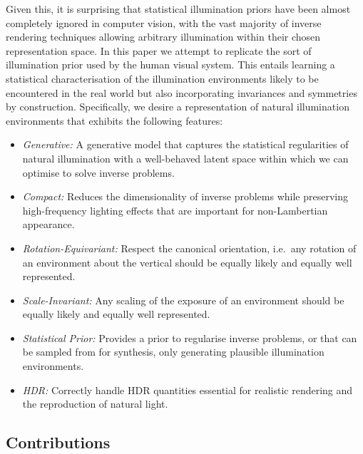 Given this, it is surprising that statistical illumination priors have been almost completely ignored in computer vision, with the vast majority of inverse rendering techniques allowing arbitrary illumination within their chosen representation space. In this paper we attempt to replicate the sort of illumination prior used by the human visual system. This entails learning a statistical characterisation of the illumination environments likely to be encountered in the real world but also incorporating invariances and symmetries by construction. Specifically, we desire a representation of natural illumination environments that exhibits the following features:
\begin{itemize}[leftmargin=*]
    \item \emph{Generative:} A generative model that captures the statistical regularities of natural illumination with a well-behaved latent space within which we can optimise to solve inverse problems.
    \item \emph{Compact:} Reduces the dimensionality of inverse problems while preserving high-frequency lighting effects that are important for non-Lambertian appearance.
    \item \emph{Rotation-Equivariant:} Respect the canonical orientation, i.e.~any rotation of an environment about the vertical should be equally likely and equally well represented.
    \item \emph{Scale-Invariant:} Any scaling of the exposure of an environment should be equally likely and equally well represented.
    \item \emph{Statistical Prior:} Provides a prior to regularise inverse problems, or that can be sampled from for synthesis, only generating plausible illumination environments.
    \item \emph{HDR:} Correctly handle HDR quantities essential for realistic rendering and the reproduction of natural light.
\end{itemize}

\subsection{Contributions}

